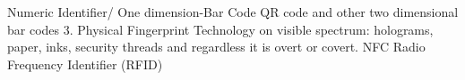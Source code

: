 \documentclass[thesis.tex]{subfiles}
\begin{document}




Numeric Identifier/ One dimension-Bar Code
QR code and other two dimensional bar codes
3. Physical Fingerprint Technology on visible spectrum: holograms, paper, inks, security threads and regardless it is overt or covert.
NFC Radio Frequency Identifier (RFID)
\end{document}
